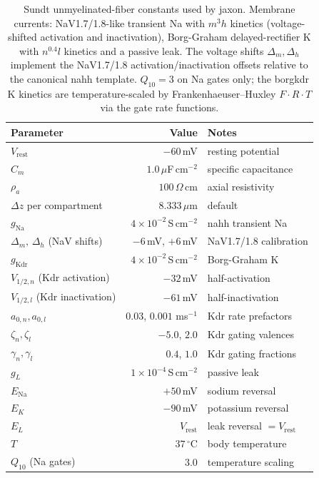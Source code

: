 \begin{table}[h]
  \centering
  \caption{Sundt unmyelinated-fiber constants used by jaxon.  Membrane
    currents: NaV1.7/1.8-like transient Na with $m^3 h$ kinetics
    (voltage-shifted activation and inactivation), Borg-Graham
    delayed-rectifier K with $n^{0.4} l$ kinetics and a passive leak.
    The voltage shifts $\Delta_m,\Delta_h$ implement the NaV1.7/1.8
    activation/inactivation offsets relative to the canonical nahh
    template.  $Q_{10} = 3$ on Na gates only; the borgkdr K kinetics
    are temperature-scaled by Frankenhaeuser--Huxley
    $F\cdot R\cdot T$ via the gate rate functions.}
  \label{tab:app-sundt}
  \small
  \begin{tabular}{l r p{4.7cm}}
    \toprule
    Parameter & Value & Notes \\
    \midrule
    $V_{\mathrm{rest}}$       & $-60$\,mV  & resting potential \\
    $C_m$                     & $1.0\,\mu$F\,cm$^{-2}$ & specific capacitance \\
    $\rho_a$                  & $100\,\Omega$\,cm       & axial resistivity \\
    $\Delta z$ per compartment & $8.333\,\mu$m          & default \\
    $g_{\mathrm{Na}}$         & $4\times 10^{-2}$\,S\,cm$^{-2}$ & nahh transient Na \\
    $\Delta_m,\,\Delta_h$ (NaV shifts) & $-6$\,mV, $+6$\,mV & NaV1.7/1.8 calibration \\
    $g_{\mathrm{Kdr}}$        & $4\times 10^{-2}$\,S\,cm$^{-2}$ & Borg-Graham K \\
    $V_{1/2,n}$ (Kdr activation)   & $-32$\,mV & half-activation \\
    $V_{1/2,l}$ (Kdr inactivation) & $-61$\,mV & half-inactivation \\
    $a_{0,n}, a_{0,l}$        & $0.03$, $0.001$ ms$^{-1}$ & Kdr rate prefactors \\
    $\zeta_n, \zeta_l$        & $-5.0$, $2.0$ & Kdr gating valences \\
    $\gamma_n, \gamma_l$      & $0.4$, $1.0$  & Kdr gating fractions \\
    $g_L$                     & $1\times 10^{-4}$\,S\,cm$^{-2}$ & passive leak \\
    $E_{\mathrm{Na}}$         & $+50$\,mV   & sodium reversal \\
    $E_K$                     & $-90$\,mV   & potassium reversal \\
    $E_L$                     & $V_{\mathrm{rest}}$ & leak reversal $=V_{\mathrm{rest}}$ \\
    $T$                       & $37\,^\circ$C & body temperature \\
    $Q_{10}$ (Na gates)       & $3.0$         & temperature scaling \\
    \bottomrule
  \end{tabular}
\end{table}


